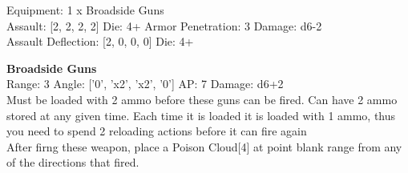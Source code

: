Equipment: 1 x Broadside Guns \\

Assault: [2, 2, 2, 2] Die: 4+ Armor Penetration: 3 Damage: d6-2 \\
Assault Deflection: [2, 0, 0, 0] Die: 4+\\
\indent  



{\bf Broadside Guns } \\



Range: 3  Angle: ['0', 'x2', 'x2', '0'] AP: 7 Damage: d6+2 \\
Must be loaded with 2 ammo before these guns can be fired. Can have 2 ammo stored at any given time. Each time it is loaded it is loaded with 1 ammo, thus you need to spend 2 reloading actions before it can fire again\\ 
After firng these weapon, place a Poison Cloud[4] at point blank range from any of the directions that fired.\\ 




 















